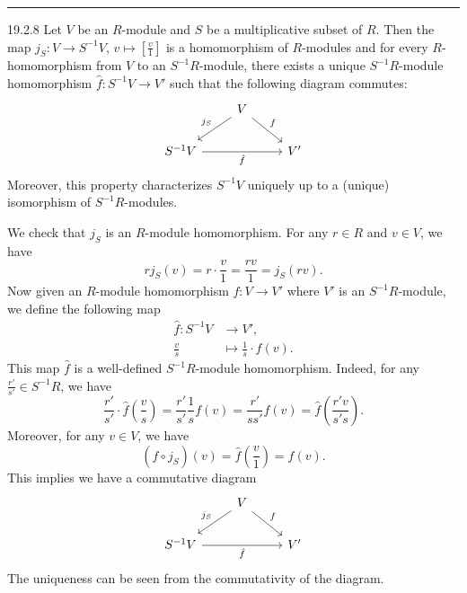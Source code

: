 \documentclass[letterpaper, 12pt]{article}
\begin{document}
\noindent\rule{7in}{2.8pt}
\begin{problem}{19.2.8}
Let \(V\) be an \(R\)-module and \(S\) be a multiplicative subset of \(R\). Then the map \(j_S:V\rightarrow S^{-1}V\), \(v\mapsto [\frac{v}{1}]\) is a homomorphism of \(R\)-modules and for every \(R\)-homomorphism from \(V\) to an \(S^{-1}R\)-module, there exists a unique \(S^{-1}R\)-module homomorphism \(\hat{f}:S^{-1}V\rightarrow V'\) such that the following diagram commutes:
\[\begin{tikzcd}
	& V \\
	{S^{-1}V} && {V'}
	\arrow["{j_S}"', from=1-2, to=2-1]
	\arrow["f", from=1-2, to=2-3]
	\arrow["{\hat{f}}"', from=2-1, to=2-3]
\end{tikzcd}\]
Moreover, this property characterizes \(S^{-1}V\) uniquely up to a (unique) isomorphism of \(S^{-1}R\)-modules.
\end{problem}
\begin{solution}
We check that \(j_S\) is an \(R\)-module homomorphism. For any \(r\in R\) and \(v\in V\), we have 
\[r j_S(v)=r\cdot \frac{v}{1}=\frac{rv}{1}=j_S(rv).\]
Now given an \(R\)-module homomorphism \(f:V\rightarrow V'\) where \(V'\) is an \(S^{-1}R\)-module, we define the following map 
\begin{align*}
    \hat{f}: S^{-1}V&\rightarrow V',\\ 
             \frac{v}{s}&\mapsto \frac{1}{s}\cdot f(v).
\end{align*} 
This map \(\hat{f}\) is a well-defined \(S^{-1}R\)-module homomorphism. Indeed, for any \(\frac{r'}{s'}\in S^{-1}R\), we have 
\[\frac{r'}{s'}\cdot \hat{f}(\frac{v}{s})=\frac{r'}{s'}\frac{1}{s}f(v)=\frac{r'}{ss'}f(v)=\hat{f}(\frac{r'v}{s's}).\]
Moreover, for any \(v\in V\), we have 
\[(\hat{f}\circ j_S)(v)=\hat{f}(\frac{v}{1})=f(v).\]
This implies we have a commutative diagram 
\[\begin{tikzcd}
	& V \\
	{S^{-1}V} && {V'}
	\arrow["{j_S}"', from=1-2, to=2-1]
	\arrow["f", from=1-2, to=2-3]
	\arrow["{\hat{f}}"', from=2-1, to=2-3]
\end{tikzcd}\]
The uniqueness can be seen from the commutativity of the diagram.
\end{solution}
\end{document}
